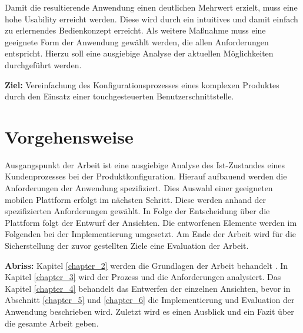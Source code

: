 Damit die resultierende Anwendung einen deutlichen Mehrwert erzielt, muss eine hohe Usability erreicht werden. Diese wird durch ein intuitives und damit einfach zu erlernendes Bedienkonzept erreicht. Als weitere Maßnahme muss eine geeignete Form der Anwendung gewählt werden, die allen Anforderungen entspricht. Hierzu soll eine ausgiebige Analyse der aktuellen Möglichkeiten durchgeführt werden.

\begin{mdframed}[backgroundcolor=gray!40,shadow=true,roundcorner=8pt]
\textbf{Ziel:} \newline
Vereinfachung des Konfigurationsprozesses eines komplexen Produktes durch den Einsatz einer touchgesteuerten Benutzerschnittstelle.
\end{mdframed}

\section{Vorgehensweise}
Ausgangspunkt der Arbeit ist eine ausgiebige Analyse des Ist-Zustandes eines Kundenprozesses bei der Produktkonfiguration. Hierauf aufbauend werden die Anforderungen der Anwendung spezifiziert. Dies Auswahl einer geeigneten mobilen Plattform erfolgt im nächsten Schritt. Diese werden anhand der spezifizierten Anforderungen gewählt. In Folge der Entscheidung über die Plattform folgt der Entwurf der Ansichten. Die entworfenen Elemente werden im Folgenden bei der Implementierung umgesetzt. Am Ende der Arbeit wird für die Sicherstellung der zuvor gestellten Ziele eine Evaluation der Arbeit. 
\par
\textbf{Abriss: }
Kapitel \ref{chapter_2} werden die Grundlagen der Arbeit behandelt . In Kapitel \ref{chapter_3} wird der Prozess und die Anforderungen analysiert. Das Kapitel \ref{chapter_4} behandelt das Entwerfen der einzelnen Ansichten, bevor in Abschnitt \ref{chapter_5} und \ref{chapter_6} die Implementierung und Evaluation der Anwendung beschrieben wird. Zuletzt wird es einen Ausblick und ein Fazit über die gesamte Arbeit geben.







